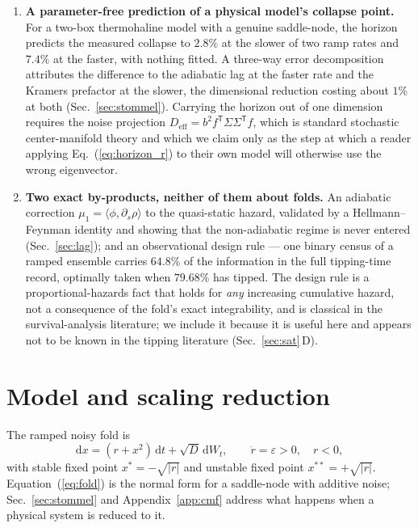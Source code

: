 \documentclass[%
 aip,
 cha,
 amsmath,amssymb,
 reprint,
 superscriptaddress,
 floatfix,
]{revtex4-2}
\newcommand{\dd}{\mathrm{d}}
\begin{document}
\begin{enumerate}
\item \textbf{A parameter-free prediction of a physical model's collapse point.}  For a two-box thermohaline model with a genuine saddle-node, the horizon predicts the measured collapse to $2.8\%$ at the slower of two ramp rates and $7.4\%$ at the faster, with nothing fitted.  A three-way error decomposition attributes the difference to the adiabatic lag at the faster rate and the Kramers prefactor at the slower, the dimensional reduction costing about $1\%$ at both (Sec.~\ref{sec:stommel}).  Carrying the horizon out of one dimension requires the noise projection $D_{\mathrm{eff}}=b^2f^{\mathsf T}\Sigma\Sigma^{\mathsf T}f$, which is standard stochastic center-manifold theory and which we claim only as the step at which a reader applying Eq.~(\ref{eq:horizon_r}) to their own model will otherwise use the wrong eigenvector.

\item \textbf{Two exact by-products, neither of them about folds.}  An adiabatic correction $\mu_1=\langle\phi,\partial_s\rho\rangle$ to the quasi-static hazard, validated by a Hellmann--Feynman identity and showing that the non-adiabatic regime is never entered (Sec.~\ref{sec:lag}); and an observational design rule --- one binary census of a ramped ensemble carries $64.8\%$ of the information in the full tipping-time record, optimally taken when $79.68\%$ has tipped.  The design rule is a proportional-hazards fact that holds for \emph{any} increasing cumulative hazard, not a consequence of the fold's exact integrability, and is classical in the survival-analysis literature; we include it because it is useful here and appears not to be known in the tipping literature (Sec.~\ref{sec:sat}\,D).

\end{enumerate}

\section{\label{sec:model}Model and scaling reduction}

The ramped noisy fold is
\begin{equation}
\label{eq:fold}
\dd x=(r+x^2)\,\dd t+\sqrt D\,\dd W_t,\qquad \dot r=\varepsilon>0,\quad r<0,
\end{equation}
with stable fixed point $x^\ast=-\sqrt{|r|}$ and unstable fixed point $x^{\ast\ast}=+\sqrt{|r|}$.  Equation~(\ref{eq:fold}) is the normal form for a saddle-node with additive noise; Sec.~\ref{sec:stommel} and Appendix~\ref{app:cmf} address what happens when a physical system is reduced to it.
\end{document}
